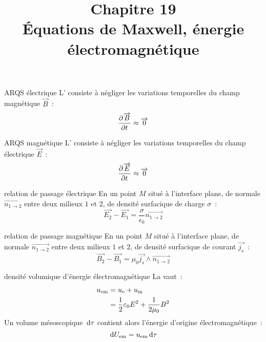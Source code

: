 

\setcounter{chapitre}{19}

\title{\Large Chapitre 19 \\ \Huge Équations de Maxwell, énergie électromagnétique}



\maketitle

\begin{definition}{}{ARQS électrique}
    L' consiste à négliger les variations temporelles du champ magnétique $\vec{B}$~:
    $$\frac{\partial^{}\overrightarrow{B}}{\partial t^{}} \approx \overrightarrow{0}$$
\end{definition}

\begin{definition}{}{ARQS magnétique}
    L' consiste à négliger les variations temporelles du champ électrique $\vec{E}$~:
    $$\frac{\partial^{}\overrightarrow{E}}{\partial t^{}} \approx \overrightarrow{0}$$
\end{definition}

\begin{theoreme}{}{relation de passage électrique}
    En un point $M$ situé à l'interface plane, de normale $\vec{n_{1\to 2}}$ entre deux milieux $1$ et $2$, de densité surfacique de charge $\sigma$~:
    $$\vec{E_2} - \vec{E_1} = \frac{\sigma}{\epsilon_0} \vec{n_{1\to 2}}$$
\end{theoreme}

\begin{theoreme}{}{relation de passage magnétique}
    En un point $M$ situé à l'interface plane, de normale $\vec{n_{1\to 2}}$ entre deux milieux $1$ et $2$, de densité surfacique de courant $\vec{j_s}$~:
    $$\vec{B_2} - \vec{B_1} = \mu_0 \vec{j_s} \wedge \vec{n_{1\to 2}}$$
\end{theoreme}

\begin{definition}{}{densité volumique d'énergie électromagnétique}
    La  vaut~:
    \begin{align*}
        u_{\mathrm{em}} &= u_{\mathrm{e}} + u_{\mathrm{m}}\\
        &= \frac{1}{2}\varepsilon_0 E^2 + \frac{1}{2\mu_0}B^2
    \end{align*}
    Un volume mésoscopique $\,\mathrm{d}\tau$ contient alors l'énergie d'origine électromagnétique~:
    $$\,\mathrm{d}U_{\mathrm{em}} = u_{\mathrm{em}} \,\mathrm{d}\tau$$
\end{definition}

